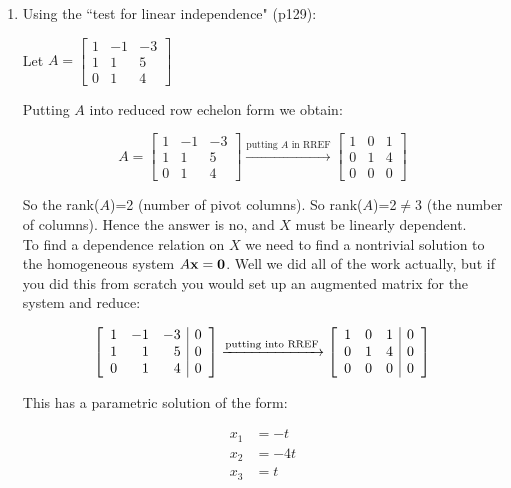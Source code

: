 \documentclass[12pt]{article}
\begin{document}
\begin{enumerate}
\item Using the ``test for linear independence" (p129):

Let $A=\left[ \begin{array}{rrr} 1 & -1 & -3  \\ 1 & 1 & 5 \\ 0&1&4  \end{array} \right] $

Putting $A$ into reduced row echelon form we obtain:

\[ A=\left[ \begin{array}{rrr} 1 & -1 & -3  \\ 1 & 1 & 5 \\ 0&1&4  \end{array} \right] \xrightarrow[]{\text{putting } A \text{ in RREF}}  \left[ \begin{array}{rrr} 1 & 0 & 1  \\ 0 & 1 & 4 \\ 0&0&0  \end{array} \right]
\]

So the rank($A$)=2 (number of pivot columns).  So rank($A$)=2$\neq$3 (the number of columns). Hence the answer is \colorbox{myblue}{no}, and $X$ must be linearly dependent.\\

To find a dependence relation on $X$ we need to find a nontrivial solution to the homogeneous system $A{\bf x} ={\bf 0}$. Well we did all of the work actually, but if you did this from scratch you would set up an augmented matrix for the system and reduce:

\[ \left[ \begin{array}{rrr| r} 1 & -1 & -3 & 0 \\ 1 & 1 & 5 & 0 \\ 0&1&4 &0 \end{array} \right] \xrightarrow[]{\text{putting into RREF}}  \left[ \begin{array}{rrr| r} 1 & 0 & 1 &0 \\ 0 & 1 & 4& 0 \\ 0&0&0& 0  \end{array} \right]
\]

This has a parametric solution of the form:

\begin{align*}
x_1 &= -t\\
x_2 &= -4t\\
x_3 &= t 
\end{align*}


\end{enumerate}
\end{document}
